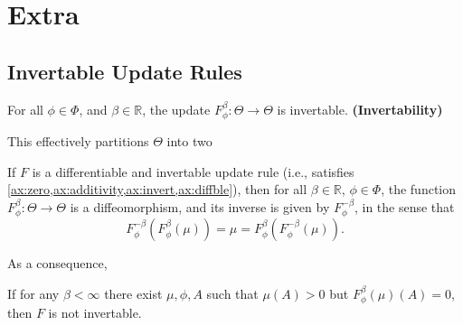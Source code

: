 \documentclass{article}
\begin{document}
\clearpage
\appendix
\section{Extra}

\subsection{Invertable Update Rules}

\begin{CFaxioms}
    \item For all $\phi\in\Phi$, and $\beta \in \mathbb R$, the update
    $F^{\beta}_{\phi}: \Theta \to \Theta$ is invertable.
    \hfill\textbf{(Invertability)} \label{ax:invert}
\end{CFaxioms}


This effectively partitions $\Theta$ into two


\begin{prop}
    If $F$ is a differentiable and invertable update rule (i.e., satisfies \cref{ax:zero,ax:additivity,ax:invert,ax:diffble}), then for all $\beta \in \mathbb R$, $\phi \in \Phi$, the function
    $F^\beta_\phi : \Theta \to \Theta$
    is a diffeomorphism, and its inverse is given by $F^{-\beta}_\phi$, in the sense that
    \[
        F^{-\beta}_\phi( F^{\beta}_\phi (\mu) ) = \mu = F^{\beta}_\phi( F^{-\beta}_\phi (\mu) ).
     \]
\end{prop}




As a consequence,
\begin{coro}
    If for any $\beta < \infty$ there exist $\mu, \phi, A$ such that
    $\mu(A) > 0$  but $F^{\beta}_\phi(\mu)(A) = 0$, then $F$ is not invertable.
\end{coro}
\end{document}
